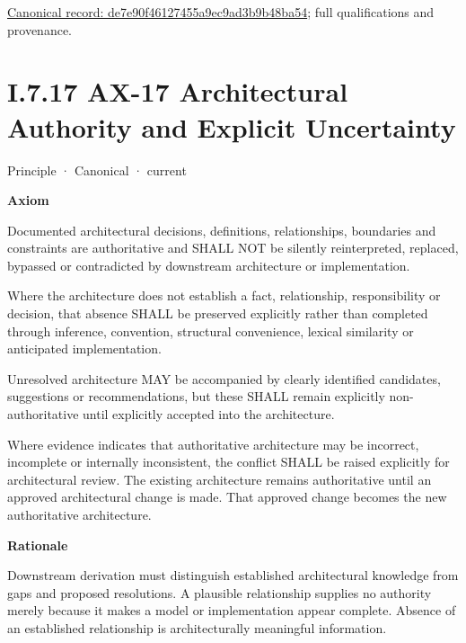 {\footnotesize \href{../../../../../../../continuum/motivation/principle/de7e90f46127455a9ec9ad3b9b48ba54.md}{Canonical record: de7e90f46127455a9ec9ad3b9b48ba54}; full qualifications and provenance.}\par
\section*{I.7.17 AX-17 Architectural Authority and Explicit Uncertainty}
\label{navigation:I.7.17}

\label{element:8882573df7ce43c6bc0f66da0a676139}
{\small Principle · Canonical · current}\par

\par\medskip\textbf{Axiom}\par


Documented architectural decisions, definitions, relationships, boundaries
and constraints are authoritative and SHALL NOT be silently reinterpreted,
replaced, bypassed or contradicted by downstream architecture or
implementation.



Where the architecture does not establish a fact, relationship,
responsibility or decision, that absence SHALL be preserved explicitly
rather than completed through inference, convention, structural
convenience, lexical similarity or anticipated implementation.



Unresolved architecture MAY be accompanied by clearly identified
candidates, suggestions or recommendations, but these SHALL remain
explicitly non-authoritative until explicitly accepted into the
architecture.



Where evidence indicates that authoritative architecture may be incorrect,
incomplete or internally inconsistent, the conflict SHALL be raised
explicitly for architectural review. The existing architecture remains
authoritative until an approved architectural change is made. That
approved change becomes the new authoritative architecture.



\par\medskip\textbf{Rationale}\par


Downstream derivation must distinguish established architectural knowledge
from gaps and proposed resolutions. A plausible relationship supplies no
authority merely because it makes a model or implementation appear
complete. Absence of an established relationship is architecturally
meaningful information.




